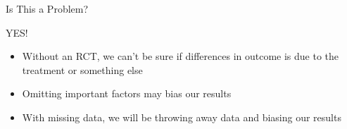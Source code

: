 \begin{frame}{Is This a Problem?}

\begin{center}
 {\Huge{YES!}}
\end{center}
  \begin{itemize}
   \item Without an RCT, we can't be sure if differences in outcome is due to the treatment or something else
   \item Omitting important factors may bias our results
   \item With missing data, we will be throwing away data and biasing our results
  \end{itemize}


\end{frame}

